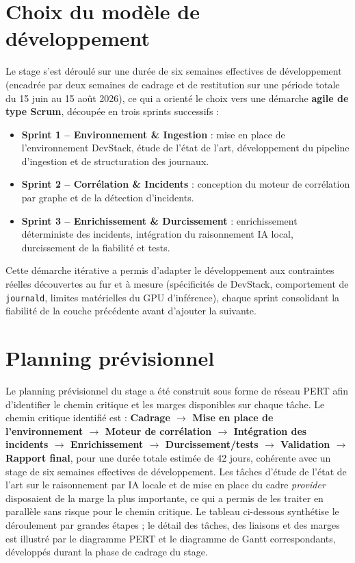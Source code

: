\documentclass[a4paper,11pt,oneside]{report}
\begin{document}
\section{Choix du modèle de développement}
Le stage s'est déroulé sur une durée de six semaines effectives de développement (encadrée par deux semaines de cadrage et de restitution sur une période totale du 15 juin au 15 août 2026), ce qui a orienté le choix vers une démarche \textbf{agile de type Scrum}, découpée en trois sprints successifs :
\begin{itemize}
    \item \textbf{Sprint 1 -- Environnement \& Ingestion} : mise en place de l'environnement DevStack, étude de l'état de l'art, développement du pipeline d'ingestion et de structuration des journaux.
    \item \textbf{Sprint 2 -- Corrélation \& Incidents} : conception du moteur de corrélation par graphe et de la détection d'incidents.
    \item \textbf{Sprint 3 -- Enrichissement \& Durcissement} : enrichissement déterministe des incidents, intégration du raisonnement IA local, durcissement de la fiabilité et tests.
\end{itemize}
Cette démarche itérative a permis d'adapter le développement aux contraintes réelles découvertes au fur et à mesure (spécificités de DevStack, comportement de \texttt{journald}, limites matérielles du GPU d'inférence), chaque sprint consolidant la fiabilité de la couche précédente avant d'ajouter la suivante.

\section{Planning prévisionnel}
Le planning prévisionnel du stage a été construit sous forme de réseau PERT afin d'identifier le chemin critique et les marges disponibles sur chaque tâche. Le chemin critique identifié est : \textbf{Cadrage $\rightarrow$ Mise en place de l'environnement $\rightarrow$ Moteur de corrélation $\rightarrow$ Intégration des incidents $\rightarrow$ Enrichissement $\rightarrow$ Durcissement/tests $\rightarrow$ Validation $\rightarrow$ Rapport final}, pour une durée totale estimée de 42 jours, cohérente avec un stage de six semaines effectives de développement. Les tâches d'étude de l'état de l'art sur le raisonnement par IA locale et de mise en place du cadre \emph{provider} disposaient de la marge la plus importante, ce qui a permis de les traiter en parallèle sans risque pour le chemin critique. Le tableau ci-dessous synthétise le déroulement par grandes étapes ; le détail des tâches, des liaisons et des marges est illustré par le diagramme PERT et le diagramme de Gantt correspondants, développés durant la phase de cadrage du stage.
\end{document}
